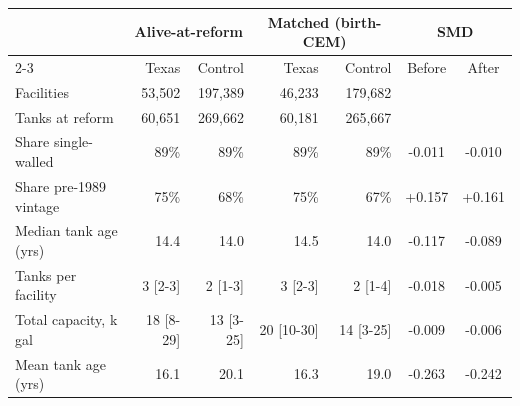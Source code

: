 \begin{center}
\footnotesize
\setlength{\tabcolsep}{5pt}
\renewcommand{\arraystretch}{1.08}
\begin{tabular}{l rr rr cc}
\hline
 & \multicolumn{2}{c}{\textbf{Alive-at-reform}} & \multicolumn{2}{c}{\textbf{Matched (birth-CEM)}} & \multicolumn{2}{c}{\textbf{SMD}} \\
\cline{2-3}\cline{4-5}\cline{6-7}
 & Texas & Control & Texas & Control & Before & After \\
\hline
Facilities & 53,502 & 197,389 & 46,233 & 179,682 &  &  \\
Tanks at reform & 60,651 & 269,662 & 60,181 & 265,667 &  &  \\
Share single-walled & 89\% & 89\% & 89\% & 89\% & -0.011 & -0.010 \\
Share pre-1989 vintage & 75\% & 68\% & 75\% & 67\% & +0.157 & +0.161 \\
Median tank age (yrs) & 14.4 & 14.0 & 14.5 & 14.0 & -0.117 & -0.089 \\
Tanks per facility & 3 [2-3] & 2 [1-3] & 3 [2-3] & 2 [1-4] & -0.018 & -0.005 \\
Total capacity, k gal & 18 [8-29] & 13 [3-25] & 20 [10-30] & 14 [3-25] & -0.009 & -0.006 \\
Mean tank age (yrs) & 16.1 & 20.1 & 16.3 & 19.0 & -0.263 & -0.242 \\
\hline
\end{tabular}
\end{center}

